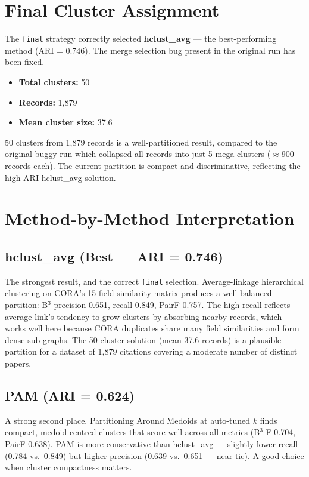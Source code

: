 \documentclass[11pt, a4paper]{article}
\begin{document}
\section{Final Cluster Assignment}

The \texttt{final} strategy correctly selected \textbf{hclust\_avg} --- the best-performing method
(ARI = 0.746). The merge selection bug present in the original run has been fixed.

\begin{itemize}[noitemsep]
  \item \textbf{Total clusters:} 50
  \item \textbf{Records:} 1,879
  \item \textbf{Mean cluster size:} 37.6
\end{itemize}

50 clusters from 1,879 records is a well-partitioned result, compared to the original buggy run
which collapsed all records into just 5 mega-clusters ($\approx$900 records each). The current
partition is compact and discriminative, reflecting the high-ARI hclust\_avg solution.

\section{Method-by-Method Interpretation}

\subsection*{hclust\_avg (Best --- ARI = 0.746)}
The strongest result, and the correct \texttt{final} selection. Average-linkage hierarchical
clustering on CORA's 15-field similarity matrix produces a well-balanced partition:
B$^3$-precision 0.651, recall 0.849, PairF 0.757. The high recall reflects average-link's
tendency to grow clusters by absorbing nearby records, which works well here because CORA
duplicates share many field similarities and form dense sub-graphs. The 50-cluster solution
(mean 37.6 records) is a plausible partition for a dataset of 1,879 citations covering a
moderate number of distinct papers.

\subsection*{PAM (ARI = 0.624)}
A strong second place. Partitioning Around Medoids at auto-tuned $k$ finds compact, medoid-centred
clusters that score well across all metrics (B$^3$-F 0.704, PairF 0.638). PAM is more
conservative than hclust\_avg --- slightly lower recall (0.784 vs.\ 0.849) but higher precision
(0.639 vs.\ 0.651 --- near-tie). A good choice when cluster compactness matters.
\end{document}
